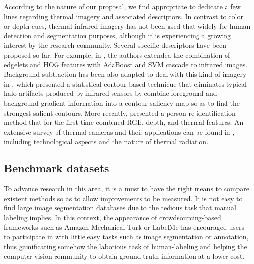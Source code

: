 \documentclass[10pt,twocolumn,letterpaper]{article}
\begin{document}
According to the nature of our proposal, we find appropriate to dedicate a few lines regarding thermal imagery and associated descriptors. In contrast to color or depth cues, thermal infrared imagery has not been used that widely for human detection and segmentation purposes, although it is experiencing a growing interest by the research community. Several specific descriptors have been proposed so far. For example, in \cite{zhang2007pedestrian}, the authors extended the combination of edgelets and HOG features with AdaBoost and SVM cascade to infrared images. Background subtraction has been also adapted to deal with this kind of imagery in \cite{davis2004robust}, which presented a statistical contour-based technique that eliminates typical halo artifacts produced by infrared sensors by combine foreground and background gradient information into a contour saliency map so as to find the strongest salient contours. More recently, \cite{mogelmosetri} presented a person re-identification method that for the first time combined RGB, depth, and thermal features. An extensive survey of thermal cameras and their applications can be found in \cite{gade2014thermal}, including technological aspects and the nature of thermal radiation. 
 
\subsection{Benchmark datasets}
 
To advance research in this area, it is a must to have the right means to compare existent methods so as to allow improvements to be measured. It is not easy to find large image segmentation databases due to the tedious task that manual labeling implies. In this context, the appearance of crowdsourcing-based frameworks such as Amazon Mechanical Turk \cite{mechanicalturk} or LabelMe \cite{russell2008labelme} has encouraged users to participate in with little easy tasks such as image segmentation or annotation, thus gamificating somehow the laborious task of human-labeling and helping the computer vision community to obtain ground truth information at a lower cost.  
\end{document}

